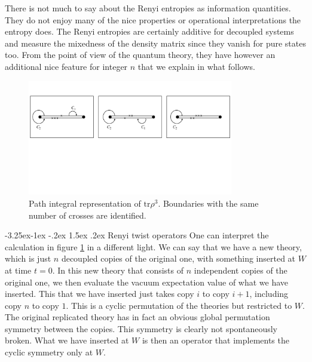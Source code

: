 \documentclass[11pt,a4paper]{article}
\makeatletter
\renewcommand\subsection{\@startsection{subsection}{2}{\z@}%
                                   {-3.25ex\@plus -1ex \@minus -.2ex}%
                                     {1.5ex \@plus .2ex}%
                                     {\normalfont\bfseries}}
\numberwithin{equation}{section}
\makeatother
\begin{document}
There is not much to say about the Renyi entropies as information quantities. They do not enjoy many of the nice properties or operational interpretations the entropy does. The Renyi entropies are certainly additive for decoupled systems and measure the mixedness of the density matrix since they vanish for pure states too. From the point of view of the quantum theory, they have however an additional nice feature for integer $n$ that we explain in what follows.   

\begin{figure}[t]
\begin{center}  
\includegraphics[width=0.8\textwidth]{replica2.pdf}
\captionsetup{width=0.9\textwidth}
\caption{Path integral representation of $\textrm{tr} \rho^3$. Boundaries with the same number of crosses are identified.}
\label{replica1}
\end{center}  
\end{figure}


\subsection{Renyi twist operators}
One can interpret the calculation in figure \ref{replica1} in a different light. We can say that we have a new theory, which is just $n$ decoupled copies of the original one, with something inserted at $W$ at time $t=0$. In this new theory that consists of $n$ independent copies of the original one, we then evaluate the vacuum expectation value of what we have inserted. This that we have inserted just takes copy $i$ to copy $i+1$, including copy $n$ to copy $1$. This is a cyclic permutation of the theories but restricted to $W$. The original replicated theory has in fact an obvious global permutation symmetry between the copies. This symmetry is clearly not spontaneously broken. What we have inserted at $W$ is then an operator that implements the cyclic symmetry only at $W$. 
\end{document}
